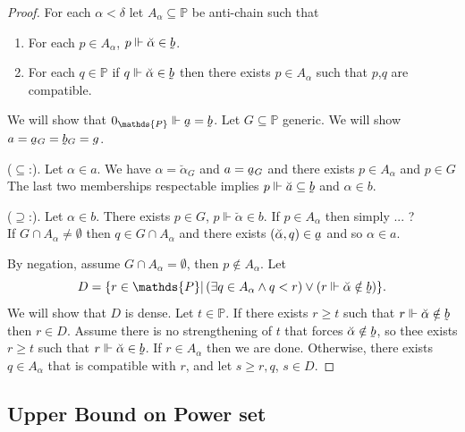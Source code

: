 \documentclass[11pt,pdftex,twoside,a4paper]{article}
\newcommand{\dsP}{\ensuremath{\mathds{P}}}
\newcommand{\forces}{\ensuremath{\Vdash}}
\newcommand{\utilde}[1]{\ensuremath{\underaccent{\tilde}{#1}}}
\theoremstyle{definition}
\begin{document}
\begin{proof}
For each \(\alpha<\delta\) let \(A_\alpha\subseteq\dsP\) be anti-chain
such that 
\begin{enumerate}[label={(\alph*)}]
\item For each \(p\in A_\alpha\), \(p\forces \breve{\alpha} \in \utilde{b}\).
\item For each \(q\in\dsP\) if \(q\forces \breve{\alpha}\in\utilde{b}\)
  then there exists \(p\in A_\alpha\) such that $p$,$q$ are compatible.
\end{enumerate}

We will show that \(0_\dsP\forces \utilde{a}=\utilde{b}\).
Let \(G\subseteq\dsP\) generic. We will show \(a=\utilde{a}_G=\utilde{b}_G=g\).

(\(\subseteq\):). Let \(\alpha\in a\). We have \(\alpha=\breve{\alpha}_G\)
and \(a=\utilde{a}_G\) and there exists \(p\in A_\alpha\) and \(p\in G\)
The last two memberships respectable implies
\(p\forces \breve{a}\subseteq \utilde{b}\) and \(\alpha\in b\).

(\(\supseteq\):). Let \(\alpha\in b\).
There exists \(p\in G\), \(p\forces \breve{\alpha}\in b\).
If \(p\in A_\alpha\) then simply ... ?\\
If \(G\cap A_\alpha \neq \emptyset\) then \(q\in G\cap A_\alpha\)
and there exists \((\breve{\alpha},q) \in\utilde{a}\)
and so \(\alpha\in a\).

By negation, assume \(G\cap A_\alpha=\emptyset\),
then \(p\notin A_\alpha\).
Let
\begin{equation*}
D = \{r\in\dsP|\,
  (\exists q\in A_\alpha \land q<r) \lor
    (r\forces \breve{\alpha} \notin \utilde{b})
  \}.
\end{equation*}
We will show that $D$ is dense.
Let \(t\in\dsP\). If there exists \(r\geq t\) such that
\(r\forces \breve{\alpha}\notin\utilde{b}\) then \(r\in D\).
Assume there is no strengthening of $t$ that forces
\(\breve{\alpha}\notin\utilde{b}\), so thee exists \(r\geq t\) such that
\(r\forces \breve{\alpha}\in\utilde{b}\). If \(r\in A_\alpha\)
then we are done. Otherwise, there exists \(q\in A_\alpha\) that is compatible
with $r$, and let \(s\geq r,q\), \(s\in D\).
\end{proof}



\subsection{Upper Bound on Power set}
\end{document}
